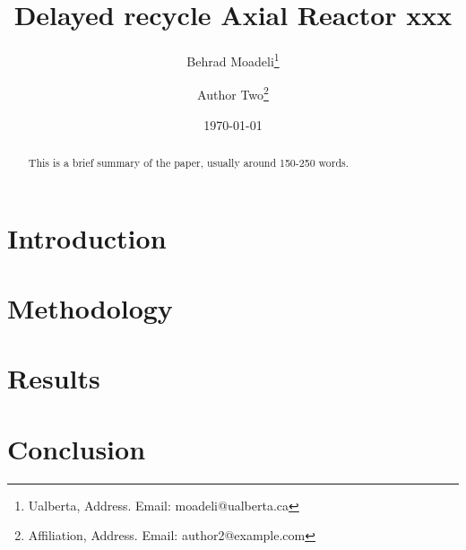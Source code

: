 \documentclass[letterpaper,11pt]{article}
\title{Delayed recycle Axial Reactor xxx}
\author{
  Behrad Moadeli\thanks{Ualberta, Address. Email: moadeli@ualberta.ca} \and
  Author Two\thanks{Affiliation, Address. Email: author2@example.com}
}
\date{\today}
\begin{document}
\maketitle

\begin{abstract}
    This is a brief summary of the paper, usually around 150-250 words. \lipsum[1-1]
\end{abstract}

\section{Introduction}


\section{Methodology}


\section{Results}


\section{Conclusion}




\end{document}

